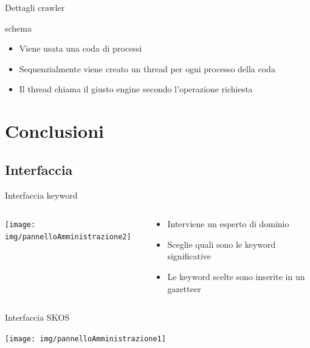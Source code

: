 \documentclass[dvips, 11pt]{beamer}
\begin{document}
\begin{frame}{Dettagli crawler}
  \begin{block}{schema}
    
  \end{block}
  \pause
  \begin{itemize}
    \item Viene usata una \alert{coda di processi}
      \pause
    \item Sequenzialmente viene creato un \alert{thread} per ogni processo della coda
      \pause
    \item Il thread chiama il giusto \alert{engine} secondo l'operazione richiesta
      \pause
  \end{itemize}
\end{frame}

\section{Conclusioni}

\subsection{Interfaccia}

\begin{frame}{Interfaccia keyword}
  \begin{columns}
    \begin{column}{0.5\textwidth}
      \texttt{[image: img/pannelloAmministrazione2]}
    \end{column}
    \begin{column}{0.5\textwidth}
      \begin{itemize}
      \item Interviene un \alert{esperto di dominio}
        \pause
      \item Sceglie quali sono le \alert{keyword} significative
        \pause
      \item Le keyword scelte sono inserite in un \alert{gazetteer}
      \end{itemize}
    \end{column}
  \end{columns}
\end{frame}

\begin{frame}{Interfaccia SKOS}
%    
  \begin{center}
    \texttt{[image: img/pannelloAmministrazione1]}
  \end{center}
  
\end{frame}
\end{document}

